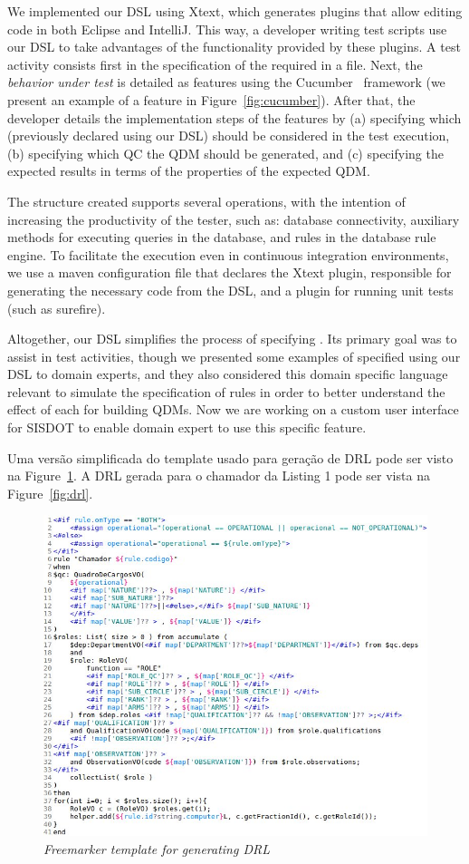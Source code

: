 We implemented our DSL using Xtext, which generates plugins that allow editing code in both Eclipse and IntelliJ. 
This way, a developer writing test scripts use our DSL to take advantages of the functionality provided by these plugins.
A test activity consists first in the specification of the required \callers in a file. Next, the \emph{behavior under 
test} is detailed as features using the Cucumber~\cite{wynne2017cucumber} framework (we present an 
example of a feature in Figure~\ref{fig:cucumber}). After that, the developer details 
the implementation steps of the features by (a) specifying which \callers (previously declared using our DSL) should be considered 
in the test execution, (b) specifying which QC the QDM should be generated, and (c) specifying the expected results in terms 
of the properties of the expected QDM. 

The structure created supports several operations, with the intention 
of increasing the productivity of the tester, such as: database connectivity, auxiliary methods for executing queries 
in the database, and rules in the database rule engine. To facilitate the execution even in continuous integration 
environments, we use a maven configuration file that declares the Xtext plugin, responsible for 
generating the necessary code from the DSL, and a plugin for running unit tests (such as surefire).


Altogether, our DSL simplifies the process of specifying \callers. Its primary goal was to 
assist in test activities, though we presented some examples of \callers specified using 
our DSL to domain experts, and they also considered this domain specific language relevant 
to simulate the specification of rules in order to better understand the effect of each 
\shc for building QDMs. Now we are working on a custom user interface for SISDOT to enable domain 
expert to use this specific feature. 


{\color{red}Uma versão simplificada do template usado para geração de DRL pode ser visto na} Figure~\ref{fig:template}. {\color{red}A DRL gerada para o chamador da Listing 1 pode ser vista na} Figure~\ref{fig:drl}.

\begin{figure}[!ht] \centering
	\includegraphics[width=.47\textwidth]{img/artigo_template.jpg}
	\caption{\it Freemarker template for generating DRL} 
	\label{fig:template}
\end{figure}

